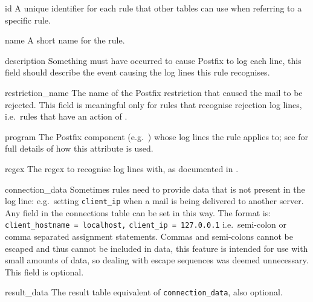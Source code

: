 \begin{boldeqlist}

    \item [id] A unique identifier for each rule that other tables can use
        when referring to a specific rule.

    \item [name] A short name for the rule.

    \item [description] Something must have occurred to cause Postfix to
        log each line, this field should describe the event causing the log
        lines this rule recognises.

    \item [restriction\_name] The name of the Postfix restriction that
        caused the mail to be rejected.  This field is meaningful only for
        rules that recognise rejection log lines, i.e.\ rules that have an
        action of .

    \item [program] The Postfix component (e.g.\ ) whose log
        lines the rule applies to; see  for full details of how this attribute is used.

    \item [regex] The regex to recognise log lines with, as documented in
        .

    \item [connection\_data] Sometimes rules need to provide data that is
        not present in the log line: e.g.\ setting \texttt{client\_ip} when
        a mail is being delivered to another server.  Any field in the
        connections table can be set in this way.  The format is:
        \newline{} \tab{} \texttt{ client\_hostname = localhost,}
        \newline{} \tab{} \tab{} \texttt{client\_ip = 127.0.0.1} \newline{}
        i.e.\ semi-colon or comma separated assignment statements.  Commas
        and semi-colons cannot be escaped and thus cannot be included in
        data, this feature is intended for use with small amounts of data,
        so dealing with escape sequences was deemed unnecessary.  This
        field is optional.

    \item [result\_data] The result table equivalent of
        \texttt{connection\_data}, also optional.


\end{boldeqlist}
